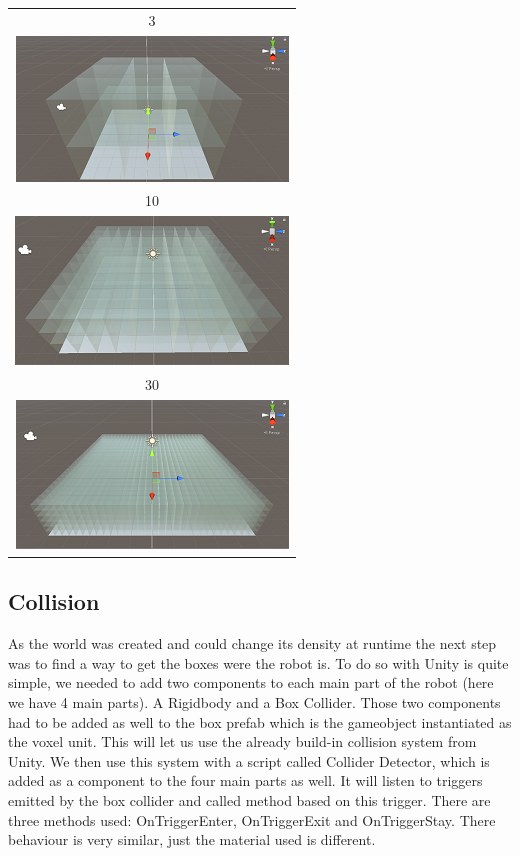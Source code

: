 \documentclass{scrartcl}
\begin{document}
\begin{center}
  \begin{tabular}{c}
    3 \\
    \includegraphics{voxel_world_3}  \\
    10 \\
    \includegraphics{voxel_world_10} \\
    30 \\
    \includegraphics{voxel_world_30}
  \end{tabular}
\end{center}

\subsection{Collision}

As the world was created and could change its density at runtime the next step was to find a way to get the boxes were the robot is. 
To do so with Unity is quite simple, we needed to add two components to each main part of the robot (here we have 4 main parts). 
A Rigidbody and a Box Collider. Those two components had to be added as well to the box prefab which is the gameobject instantiated as the voxel unit. 
This will let us use the already build-in collision system from Unity. We then use this system with a script called Collider Detector, 
which is added as a component to the four main parts as well. It will listen to triggers emitted by the box collider and called method based on this trigger. 
There are three methods used: OnTriggerEnter, OnTriggerExit and OnTriggerStay. There behaviour is very similar, just the material used is different.
\end{document}

